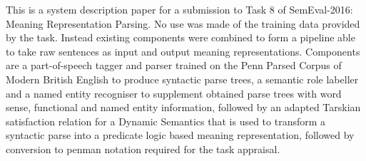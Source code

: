 This is a system description paper for a submission to Task 8 of SemEval-2016: Meaning Representation Parsing.  No use was made of the training data provided by the task.  Instead existing components were combined to form a pipeline able to take raw sentences as input and output meaning representations.  Components are a part-of-speech tagger and parser trained on the Penn Parsed Corpus of Modern British English to produce syntactic parse trees, a semantic role labeller and a named entity recogniser to supplement obtained parse trees with word sense, functional and named entity information, followed by an adapted Tarskian satisfaction relation for a Dynamic Semantics that is used to transform a syntactic parse into a predicate logic based meaning representation, followed by conversion to penman notation required for the task appraisal.
